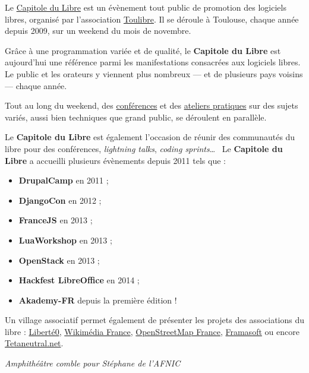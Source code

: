 
Le \href{http://capitoledulibre.org}{Capitole du Libre} est un
 évènement tout public de promotion des logiciels libres,
 organisé par l’association \href{http://toulibre.org/}{Toulibre}.
 Il se déroule à Toulouse, chaque année depuis 2009, sur un 
 weekend du mois de novembre.

Grâce à une programmation variée et de qualité, 
 le \textbf{Capitole du Libre} est aujourd’hui une référence
 parmi les manifestations consacrées aux logiciels libres. Le
 public et les orateurs y viennent plus nombreux — et
 de plusieurs pays voisins — chaque année.

Tout au long du weekend, des
 \href{https://2015.capitoledulibre.org/programme/conferences/}{conférences}
 et des \href{https://2015.capitoledulibre.org/programme/ateliers/}{ateliers pratiques}
 sur des sujets variés, aussi bien techniques que grand public, se déroulent en parallèle.

 
\Separateur

Le \textbf{Capitole du Libre} est également l'occasion de réunir des 
communautés du libre pour des conférences, \textit{lightning talks}, 
\textit{coding sprints}\dots ~ Le \textbf{Capitole du Libre} a 
accueilli plusieurs évènements depuis 2011 tels que :
\begin{itemize}[label=$\bullet$]
\item \textbf{DrupalCamp} en 2011 ;
\item \textbf{DjangoCon} en 2012 ;
\item \textbf{FranceJS} en 2013 ;
\item \textbf{LuaWorkshop} en 2013 ;
\item \textbf{OpenStack} en 2013 ;
\item \textbf{Hackfest LibreOffice}  en 2014 ;
\item \textbf{Akademy-FR} depuis la première édition !
\end{itemize}

\Separateur

Un village associatif permet également de présenter les projets des associations du libre : \href{http://liberte0.org/wiki/index.php?title=Accueil}{Liberté0},
 \href{http://wikimedia.fr/}{Wikimédia France},
 \href{http://openstreetmap.fr/}{OpenStreetMap France},
 \href{http://framasoft.net/}{Framasoft}
 ou encore \href{http://tetaneutral.net/}{Tetaneutral.net}.

\begin{center}
\textit{Amphithéâtre comble pour Stéphane  de l'AFNIC}
\end{center}


